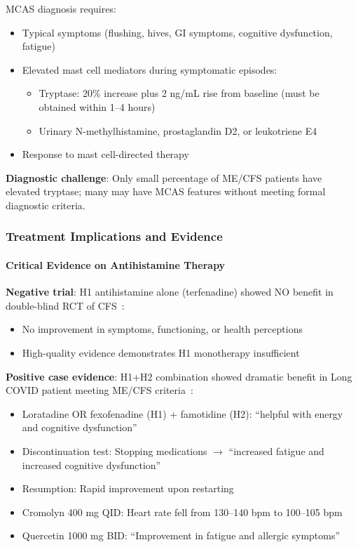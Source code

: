 MCAS diagnosis requires:
\begin{itemize}
    \item Typical symptoms (flushing, hives, GI symptoms, cognitive dysfunction, fatigue)
    \item Elevated mast cell mediators during symptomatic episodes:
    \begin{itemize}
        \item Tryptase: 20\% increase plus 2 ng/mL rise from baseline (must be obtained within 1--4 hours)
        \item Urinary N-methylhistamine, prostaglandin D2, or leukotriene E4
    \end{itemize}
    \item Response to mast cell-directed therapy
\end{itemize}

\textbf{Diagnostic challenge}: Only small percentage of ME/CFS patients have elevated tryptase; many may have MCAS features without meeting formal diagnostic criteria.

\subsubsection{Treatment Implications and Evidence}

\paragraph{Critical Evidence on Antihistamine Therapy}

\textbf{Negative trial}: H1 antihistamine alone (terfenadine) showed NO benefit in double-blind RCT of CFS~\cite{Steinberg1996}:
\begin{itemize}
    \item No improvement in symptoms, functioning, or health perceptions
    \item High-quality evidence demonstrates H1 monotherapy insufficient
\end{itemize}

\textbf{Positive case evidence}: H1+H2 combination showed dramatic benefit in Long COVID patient meeting ME/CFS criteria~\cite{Davis2023}:
\begin{itemize}
    \item Loratadine OR fexofenadine (H1) + famotidine (H2): ``helpful with energy and cognitive dysfunction''
    \item Discontinuation test: Stopping medications $\rightarrow$ ``increased fatigue and increased cognitive dysfunction''
    \item Resumption: Rapid improvement upon restarting
    \item Cromolyn 400 mg QID: Heart rate fell from 130--140 bpm to 100--105 bpm
    \item Quercetin 1000 mg BID: ``Improvement in fatigue and allergic symptoms''
\end{itemize}


